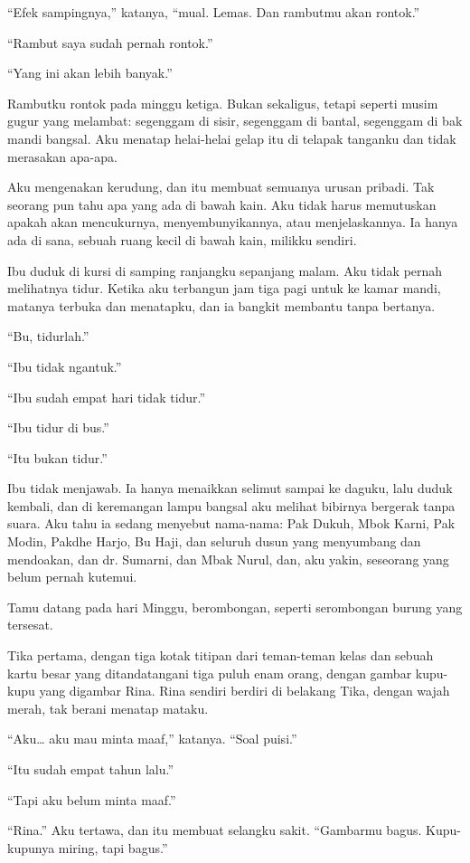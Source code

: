 \documentclass[11pt,twoside,openany]{book}
\makeatletter
\newcommand{\scenebreak}{\par\vspace{0.9em}{\centering\textsc{*\hspace{0.7em}*\hspace{0.7em}*}\par}\vspace{0.9em}\@afterindentfalse\@afterheading}
\makeatother
\begin{document}
``Efek sampingnya,'' katanya, ``mual. Lemas. Dan rambutmu akan rontok.''

``Rambut saya sudah pernah rontok.''

``Yang ini akan lebih banyak.''

Rambutku rontok pada minggu ketiga. Bukan sekaligus, tetapi seperti musim gugur yang melambat: segenggam di sisir, segenggam di bantal, segenggam di bak mandi bangsal. Aku menatap helai-helai gelap itu di telapak tanganku dan tidak merasakan apa-apa.

Aku mengenakan kerudung, dan itu membuat semuanya urusan pribadi. Tak seorang pun tahu apa yang ada di bawah kain. Aku tidak harus memutuskan apakah akan mencukurnya, menyembunyikannya, atau menjelaskannya. Ia hanya ada di sana, sebuah ruang kecil di bawah kain, milikku sendiri.

Ibu duduk di kursi di samping ranjangku sepanjang malam. Aku tidak pernah melihatnya tidur. Ketika aku terbangun jam tiga pagi untuk ke kamar mandi, matanya terbuka dan menatapku, dan ia bangkit membantu tanpa bertanya.

``Bu, tidurlah.''

``Ibu tidak ngantuk.''

``Ibu sudah empat hari tidak tidur.''

``Ibu tidur di bus.''

``Itu bukan tidur.''

Ibu tidak menjawab. Ia hanya menaikkan selimut sampai ke daguku, lalu duduk kembali, dan di keremangan lampu bangsal aku melihat bibirnya bergerak tanpa suara. Aku tahu ia sedang menyebut nama-nama: Pak Dukuh, Mbok Karni, Pak Modin, Pakdhe Harjo, Bu Haji, dan seluruh dusun yang menyumbang dan mendoakan, dan dr. Sumarni, dan Mbak Nurul, dan, aku yakin, seseorang yang belum pernah kutemui.

\scenebreak
Tamu datang pada hari Minggu, berombongan, seperti serombongan burung yang tersesat.

Tika pertama, dengan tiga kotak titipan dari teman-teman kelas dan sebuah kartu besar yang ditandatangani tiga puluh enam orang, dengan gambar kupu-kupu yang digambar Rina. Rina sendiri berdiri di belakang Tika, dengan wajah merah, tak berani menatap mataku.

``Aku\ldots{} aku mau minta maaf,'' katanya. ``Soal puisi.''

``Itu sudah empat tahun lalu.''

``Tapi aku belum minta maaf.''

``Rina.'' Aku tertawa, dan itu membuat selangku sakit. ``Gambarmu bagus. Kupu-kupunya miring, tapi bagus.''
\end{document}

